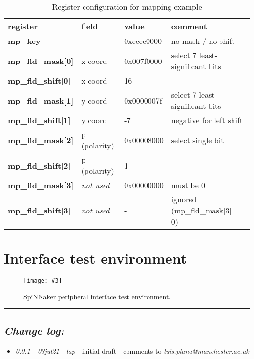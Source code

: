 \documentclass[11pt,a4paper,twoside]{article}
\newcommand{\image}[5][]
{
\begin{figure}[#2]
   \begin{center}
      \texttt{[image: \#3]}
      \caption{#5}
      \label{fig:#4}
   \end{center}
\end{figure}
}
\begin{document}
\begin{table}[!ht]
	\begin{center}
		\begin{tabular}{| l l l l |}
			\hline
			\textbf{register} & \textbf{field} & \textbf{value} & \textbf{comment}  \\%
			\hline
			\hline
			\textbf{mp\_key}           &                   & 0xeeee0000 & no mask / no shift              \\%
			\textbf{mp\_fld\_mask[0]}  & x coord           & 0x007f0000 & select 7 least-significant bits \\%
			\textbf{mp\_fld\_shift[0]} & x coord           & 16         &                                 \\%
			\textbf{mp\_fld\_mask[1]}  & y coord           & 0x0000007f & select 7 least-significant bits \\%
			\textbf{mp\_fld\_shift[1]} & y coord           & -7         & negative for left shift         \\%
			\textbf{mp\_fld\_mask[2]}  & p (polarity)      & 0x00008000 & select single bit               \\%
			\textbf{mp\_fld\_shift[2]} & p (polarity)      & 1          &                                 \\%
			\textbf{mp\_fld\_mask[3]}  & \textit{not used} & 0x00000000 & must be 0                       \\%
			\textbf{mp\_fld\_shift[3]} & \textit{not used} & -          & ignored (mp\_fld\_mask[3] = 0)  \\%
			\hline
		\end{tabular}
		\caption{Register configuration for mapping example}
	\end{center}
	\label{tab:map_regs}
\end{table}


\clearpage
\section{Interface test environment}


\image[width = 0.8 \textwidth]{!h}{spif_test_env}{fig:spif_test}
{SpiNNaker peripheral interface test environment.}


\vspace*{1.0cm}
\rule{\linewidth}{2pt}


\subsection*{\itshape Change log:}


\begin{itemize}
	\item {\itshape 0.0.1 - 03jul21 - lap} - initial draft - comments to
	{\itshape luis.plana@manchester.ac.uk}
\end{itemize}
\end{document}
